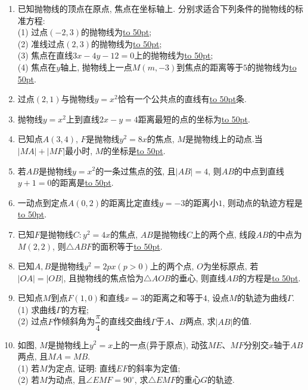\documentclass[10pt,a4paper]{article}
\newcommand{\blank}[1]{\underline{\hbox to #1pt{}}}
\begin{document}
\begin{enumerate}[1.]
\item 已知抛物线的顶点在原点, 焦点在坐标轴上. 分别求适合下列条件的抛物线的标准方程:\\
(1) 过点$(-2,3)$的抛物线为\blank{50};\\
(2) 准线过点$(2,3)$的抛物线为\blank{50};\\
(3) 焦点在直线$3x-4y-12=0$上的抛物线为\blank{50};\\
(4) 焦点在$y$轴上, 抛物线上一点$M(m,-3)$到焦点的距离等于$5$的抛物线为\blank{50}.
\item 过点$(2,1)$与抛物线$y=x^2$恰有一个公共点的直线有\blank{50}条.
\item 抛物线$y=x^2$上到直线$2x-y=4$距离最短的点的坐标为\blank{50}.
\item 已知点$A(3,4)$, $F$是抛物线$y^2=8x$的焦点, $M$是抛物线上的动点.当$|MA|+|MF|$最小时, $M$的坐标是\blank{50}.
\item 若$AB$是抛物线$y=x^2$的一条过焦点的弦, 且$|AB|=4$, 则$AB$的中点到直线$y+1=0$的距离是\blank{50}.
\item 一动点到定点$A(0,2)$的距离比定直线$y=-3$的距离小$1$, 则动点的轨迹方程是\blank{50}.
\item 已知$F$是抛物线$C:y^2=4x$的焦点, $AB$是抛物线$C$上的两个点, 线段$AB$的中点为$M(2,2)$, 则$\triangle ABF$的面积等于\blank{50}.
\item 已知$A,B$是抛物线$y^2=2px(p>0)$上的两个点, $O$为坐标原点, 若$|OA|=|OB|$, 且抛物线的焦点恰为$\triangle AOB$的垂心, 则直线$AB$的方程是\blank{50}.
\item 已知点$M$到点$F(1,0)$和直线$x=3$的距离之和等于$4$, 设点$M$的轨迹为曲线$\Gamma$.\\
(1) 求曲线$\Gamma$的方程;\\
(2) 过点$F$作倾斜角为$\dfrac{\pi}4$的直线交曲线$\Gamma$于$A$、$B$两点, 求$|AB|$的值.
\item 如图, $M$是抛物线上$y^2=x$上的一点(异于原点), 动弦$ME$、$MF$分别交$x$轴于$AB$两点, 且$MA=MB$.\\
(1) 若$M$为定点, 证明: 直线$EF$的斜率为定值;\\
(2) 若$M$为动点, 且$\angle EMF={90}^{\circ}$, 求$\triangle EMF$的重心$G$的轨迹.
\begin{center}
\end{center}
\end{enumerate}
\end{document}
